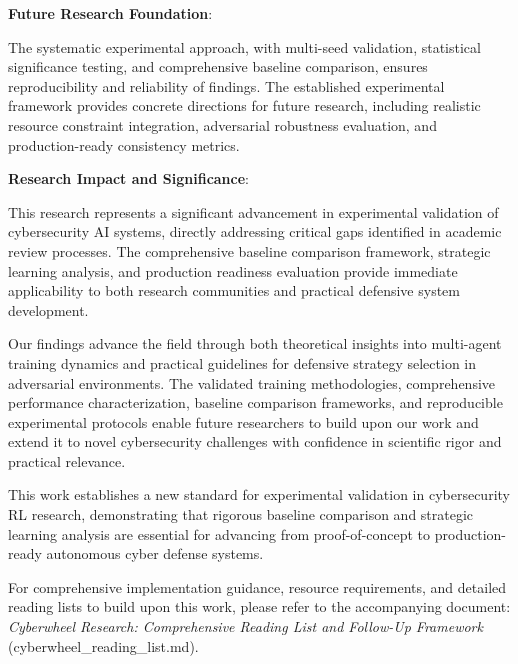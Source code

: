 \documentclass[12pt,twoside]{article}
\theoremstyle{definition}
\theoremstyle{plain}
\begin{document}
\textbf{Future Research Foundation}:

The systematic experimental approach, with multi-seed validation, statistical significance testing, and comprehensive baseline comparison, ensures reproducibility and reliability of findings. The established experimental framework provides concrete directions for future research, including realistic resource constraint integration, adversarial robustness evaluation, and production-ready consistency metrics.

\textbf{Research Impact and Significance}:

This research represents a significant advancement in experimental validation of cybersecurity AI systems, directly addressing critical gaps identified in academic review processes. The comprehensive baseline comparison framework, strategic learning analysis, and production readiness evaluation provide immediate applicability to both research communities and practical defensive system development.

Our findings advance the field through both theoretical insights into multi-agent training dynamics and practical guidelines for defensive strategy selection in adversarial environments. The validated training methodologies, comprehensive performance characterization, baseline comparison frameworks, and reproducible experimental protocols enable future researchers to build upon our work and extend it to novel cybersecurity challenges with confidence in scientific rigor and practical relevance.

This work establishes a new standard for experimental validation in cybersecurity RL research, demonstrating that rigorous baseline comparison and strategic learning analysis are essential for advancing from proof-of-concept to production-ready autonomous cyber defense systems.

For comprehensive implementation guidance, resource requirements, and detailed reading lists to build upon this work, please refer to the accompanying document: \textit{Cyberwheel Research: Comprehensive Reading List and Follow-Up Framework} (cyberwheel\_reading\_list.md).



\end{document}
